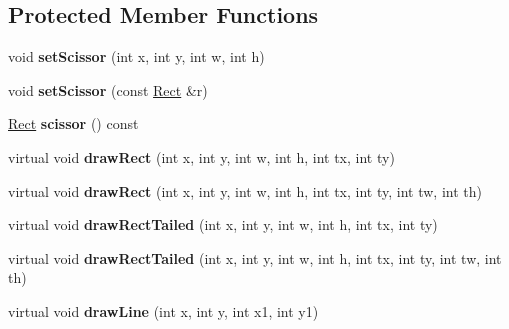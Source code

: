 \subsection*{Protected Member Functions}
\begin{DoxyCompactItemize}
\item 
\hypertarget{class_tempest_1_1_painter_device_a97bc8b26ca612e270b0c283dab648d03}{void {\bfseries set\+Scissor} (int x, int y, int w, int h)}\label{class_tempest_1_1_painter_device_a97bc8b26ca612e270b0c283dab648d03}

\item 
\hypertarget{class_tempest_1_1_painter_device_ac67acd314419949f0a0419ff3f450814}{void {\bfseries set\+Scissor} (const \hyperlink{struct_tempest_1_1_rect}{Rect} \&r)}\label{class_tempest_1_1_painter_device_ac67acd314419949f0a0419ff3f450814}

\item 
\hypertarget{class_tempest_1_1_painter_device_aa60b5cba103ed772ac274793909a0fb8}{\hyperlink{struct_tempest_1_1_rect}{Rect} {\bfseries scissor} () const }\label{class_tempest_1_1_painter_device_aa60b5cba103ed772ac274793909a0fb8}

\item 
\hypertarget{class_tempest_1_1_painter_device_a18237ee05116d6e154e2aec4bf563e7b}{virtual void {\bfseries draw\+Rect} (int x, int y, int w, int h, int tx, int ty)}\label{class_tempest_1_1_painter_device_a18237ee05116d6e154e2aec4bf563e7b}

\item 
\hypertarget{class_tempest_1_1_painter_device_afba4d5a67c3f8d96fb47a3177220e828}{virtual void {\bfseries draw\+Rect} (int x, int y, int w, int h, int tx, int ty, int tw, int th)}\label{class_tempest_1_1_painter_device_afba4d5a67c3f8d96fb47a3177220e828}

\item 
\hypertarget{class_tempest_1_1_painter_device_aa230ef6e8376696f96dc178665909db0}{virtual void {\bfseries draw\+Rect\+Tailed} (int x, int y, int w, int h, int tx, int ty)}\label{class_tempest_1_1_painter_device_aa230ef6e8376696f96dc178665909db0}

\item 
\hypertarget{class_tempest_1_1_painter_device_a180ee5b9fb464074fc83ccaa2c1c4169}{virtual void {\bfseries draw\+Rect\+Tailed} (int x, int y, int w, int h, int tx, int ty, int tw, int th)}\label{class_tempest_1_1_painter_device_a180ee5b9fb464074fc83ccaa2c1c4169}

\item 
\hypertarget{class_tempest_1_1_painter_device_a2f4c9a4afc1b3d78e512dad64de7ca2c}{virtual void {\bfseries draw\+Line} (int x, int y, int x1, int y1)}\label{class_tempest_1_1_painter_device_a2f4c9a4afc1b3d78e512dad64de7ca2c}


\end{DoxyCompactItemize}
